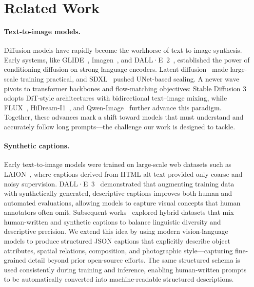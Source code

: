 \section{Related Work}



\paragraph{Text-to-image models.}
Diffusion models have rapidly become the workhorse of text-to-image synthesis. Early systems, like GLIDE~\cite{nichol2021glide}, Imagen~\cite{saharia2022photorealistic}, and DALL·E~2~\cite{ramesh2022hierarchical}, established the power of conditioning diffusion on strong language encoders. Latent diffusion~\cite{rombach2022high} made large-scale training practical, and SDXL~\cite{podell2023sdxl} pushed UNet-based scaling. A newer wave pivots to transformer backbones and flow-matching objectives: Stable Diffusion 3~\cite{esser2024scaling} adopts DiT-style architectures with bidirectional text–image mixing, while FLUX~\cite{flux2024}, HiDream-I1~\cite{cai2025hidream}, and Qwen-Image~\cite{wu2025qwenimagetechnicalreport} further advance this paradigm. Together, these advances mark a shift toward models that must understand and accurately follow long prompts---the challenge our work is designed to tackle.

\paragraph{Synthetic captions.}

Early text-to-image models were trained on large-scale web datasets such as LAION~\cite{schuhmann2022laion}, where captions derived from HTML alt text provided only coarse and noisy supervision. 
DALL·E~3~\cite{betker2023improving} demonstrated that augmenting training data with synthetically generated, descriptive captions improves both human and automated evaluations, allowing models to capture visual concepts that human annotators often omit. 
Subsequent works~\cite{esser2024scaling, liu2024playground} explored hybrid datasets that mix human-written and synthetic captions to balance linguistic diversity and descriptive precision. 
We extend this idea by using modern vision-language models to produce structured JSON captions that explicitly describe object attributes, spatial relations, composition, and photographic style—capturing fine-grained detail beyond prior open-source efforts. 
The same structured schema is used consistently during training and inference, enabling human-written prompts to be automatically converted into machine-readable structured descriptions.


